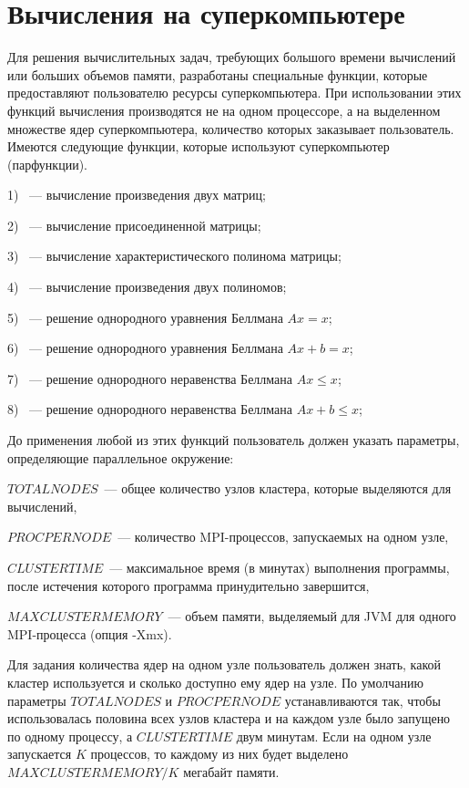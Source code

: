 \chapter{Вычисления на суперкомпьютере}

Для решения вычислительных задач, требующих большого времени вычислений или больших объемов памяти,  разработаны специальные функции,  которые предоставляют пользователю ресурсы 
суперкомпьютера.  При использовании этих функций вычисления производятся не на одном процессоре,  а на выделенном множестве ядер суперкомпьютера,  количество которых заказывает пользователь. 
Имеются следующие функции,  которые используют суперкомпьютер (парфункции). 

1) ~--- вычисление произведения двух матриц;

2) ~--- вычисление присоединенной матрицы;

3) ~--- вычисление характеристического полинома матрицы;

4) ~--- вычисление произведения двух полиномов;

5) ~--- решение однородного уравнения Беллмана $Ax=x$;

6) ~--- решение однородного уравнения Беллмана $Ax+b=x$;

7) ~--- решение однородного неравенства Беллмана $Ax\leq x$;

8) ~--- решение однородного неравенства Беллмана $Ax+b\leq x$; 

 
До применения любой из этих функций пользователь должен указать параметры,  определяющие параллельное окружение: 

$TOTALNODES$~--- общее количество узлов кластера, которые выделяются для вычислений,  

$PROCPERNODE$~--- количество MPI-процессов, запускаемых на одном узле,   

$CLUSTERTIME$~--- максимальное время (в минутах) выполнения программы,  после истечения которого программа принудительно завершится,

$MAXCLUSTERMEMORY$~--- объем памяти, выделяемый для JVM для одного MPI-процесса (опция -Xmx).

Для задания количества ядер на одном узле пользователь должен знать, какой кластер используется и сколько доступно ему ядер на узле.  По умолчанию параметры $TOTALNODES$ и  $PROCPERNODE$ устанавливаются так,  чтобы использовалась половина всех узлов кластера и на каждом узле было запущено по одному процессу,  а $CLUSTERTIME$ двум минутам. Если на одном узле запускается $K$ процессов, то каждому из них будет выделено $MAXCLUSTERMEMORY/K$ мегабайт памяти. 


